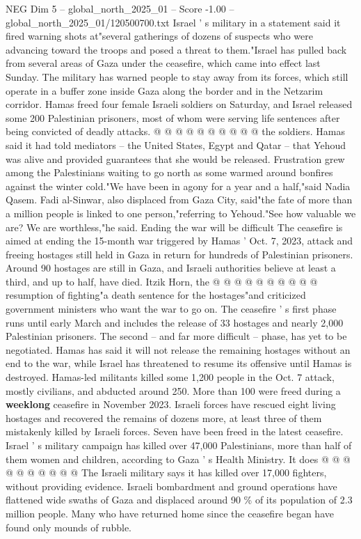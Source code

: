 \begin{textsample}{NEG Dim 5 – global\_north\_2025\_01 – Score -1.00 – global\_north\_2025\_01/120500700.txt}
Israel ' s military in a statement said it fired warning shots at"several gatherings of dozens of suspects who were advancing toward the troops and posed a threat to them."Israel has pulled back from several areas of Gaza under the ceasefire, which came into effect last Sunday.
The military has warned people to stay away from its forces, which still operate in a buffer zone inside Gaza along the border and in the Netzarim corridor.
Hamas freed four female Israeli soldiers on Saturday, and Israel released some 200 Palestinian prisoners, most of whom were serving life sentences after being convicted of deadly attacks. @ @ @ @ @ @ @ @ @ @ the soldiers.
Hamas said it had told mediators -- the United States, Egypt and Qatar -- that Yehoud was alive and provided guarantees that she would be released.
Frustration grew among the Palestinians waiting to go north as some warmed around bonfires against the winter cold."We have been in agony for a year and a half,"said Nadia Qasem.
Fadi al-Sinwar, also displaced from Gaza City, said"the fate of more than a million people is linked to one person,"referring to Yehoud."See how valuable we are?
We are worthless,"he said.
Ending the war will be difficult The ceasefire is aimed at ending the 15-month war triggered by Hamas ' Oct. 7, 2023, attack and freeing hostages still held in Gaza in return for hundreds of Palestinian prisoners.
Around 90 hostages are still in Gaza, and Israeli authorities believe at least a third, and up to half, have died.
Itzik Horn, the @ @ @ @ @ @ @ @ @ @ resumption of fighting"a death sentence for the hostages"and criticized government ministers who want the war to go on.
The ceasefire ' s first phase runs until early March and includes the release of 33 hostages and nearly 2,000 Palestinian prisoners.
The second -- and far more difficult -- phase, has yet to be negotiated.
Hamas has said it will not release the remaining hostages without an end to the war, while Israel has threatened to resume its offensive until Hamas is destroyed.
Hamas-led militants killed some 1,200 people in the Oct. 7 attack, mostly civilians, and abducted around 250.
More than 100 were freed during a \textbf{weeklong} ceasefire in November 2023.
Israeli forces have rescued eight living hostages and recovered the remains of dozens more, at least three of them mistakenly killed by Israeli forces.
Seven have been freed in the latest ceasefire.
Israel ' s military campaign has killed over 47,000 Palestinians, more than half of them women and children, according to Gaza ' s Health Ministry.
It does @ @ @ @ @ @ @ @ @ @ The Israeli military says it has killed over 17,000 fighters, without providing evidence.
Israeli bombardment and ground operations have flattened wide swaths of Gaza and displaced around 90 \% of its population of 2.3 million people.
Many who have returned home since the ceasefire began have found only mounds of rubble.

\end{textsample}
